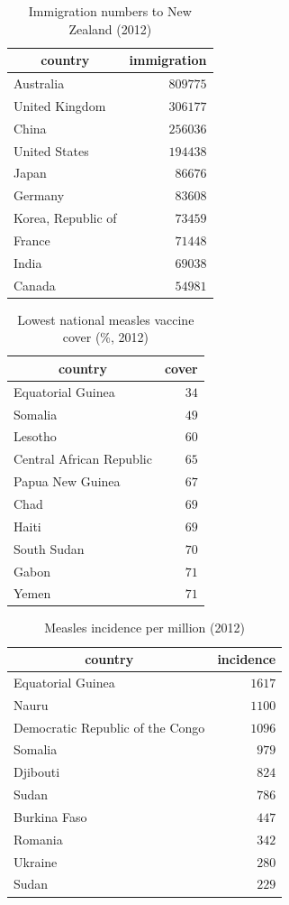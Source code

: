 \documentclass{article}
\begin{document}
\begin{table}
\caption{Immigration numbers to New Zealand (2012)}
\begin{center}
\begin{tabular}{lr}
\hline\hline
\multicolumn{1}{c}{country}&\multicolumn{1}{c}{immigration}\tabularnewline
\hline
Australia&$809775$\tabularnewline
United Kingdom&$306177$\tabularnewline
China&$256036$\tabularnewline
United States&$194438$\tabularnewline
Japan&$ 86676$\tabularnewline
Germany&$ 83608$\tabularnewline
Korea, Republic of&$ 73459$\tabularnewline
France&$ 71448$\tabularnewline
India&$ 69038$\tabularnewline
Canada&$ 54981$\tabularnewline
\hline
\end{tabular}\end{center}\label{table:immigration12}
\end{table}

\begin{table}
\caption{Lowest national measles vaccine cover (\%, 2012)}
\begin{center}
\begin{tabular}{lr}
\hline\hline
\multicolumn{1}{c}{country}&\multicolumn{1}{c}{cover}\tabularnewline
\hline
Equatorial Guinea&$34$\tabularnewline
Somalia&$49$\tabularnewline
Lesotho&$60$\tabularnewline
Central African Republic&$65$\tabularnewline
Papua New Guinea&$67$\tabularnewline
Chad&$69$\tabularnewline
Haiti&$69$\tabularnewline
South Sudan&$70$\tabularnewline
Gabon&$71$\tabularnewline
Yemen&$71$\tabularnewline
\hline
\end{tabular}\end{center}\label{table:cover12}
\end{table}

\begin{table}
\caption{Measles incidence per million (2012)}
\begin{center}
\begin{tabular}{lr}
\hline\hline
\multicolumn{1}{c}{country}&\multicolumn{1}{c}{incidence}\tabularnewline
\hline
Equatorial Guinea&$1617$\tabularnewline
Nauru&$1100$\tabularnewline
Democratic Republic of the Congo&$1096$\tabularnewline
Somalia&$ 979$\tabularnewline
Djibouti&$ 824$\tabularnewline
Sudan&$ 786$\tabularnewline
Burkina Faso&$ 447$\tabularnewline
Romania&$ 342$\tabularnewline
Ukraine&$ 280$\tabularnewline
Sudan&$ 229$\tabularnewline
\hline
\end{tabular}\end{center}\label{table:incidence12}
\end{table}
\end{document}
